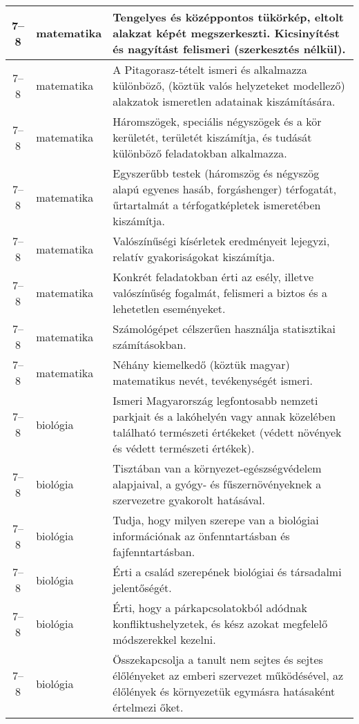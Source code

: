 \begin{small}
\begin{longtable}{c | p{2cm} |  p{11cm} }
              7--8 & matematika & Tengelyes és középpontos tükörkép, eltolt alakzat képét megszerkeszti. Kicsinyítést és nagyítást felismeri (szerkesztés nélkül). \\ \hline
              7--8 & matematika & A Pitagorasz-tételt ismeri és alkalmazza különböző, (köztük valós helyzeteket modellező) alakzatok ismeretlen adatainak kiszámítására. \\ \hline
              7--8 & matematika & Háromszögek, speciális négyszögek és a kör kerületét, területét kiszámítja, és tudását különböző feladatokban alkalmazza. \\ \hline
              7--8 & matematika & Egyszerűbb testek (háromszög és négyszög alapú egyenes hasáb, forgáshenger) térfogatát, űrtartalmát a térfogatképletek ismeretében kiszámítja. \\ \hline
              7--8 & matematika & Valószínűségi kísérletek eredményeit lejegyzi, relatív gyakoriságokat kiszámítja. \\ \hline
              7--8 & matematika & Konkrét feladatokban érti az esély, illetve valószínűség fogalmát, felismeri a biztos és a lehetetlen eseményeket. \\ \hline
              7--8 & matematika & Számológépet célszerűen használja statisztikai számításokban. \\ \hline
              7--8 & matematika & Néhány kiemelkedő (köztük magyar) matematikus nevét, tevékenységét ismeri. \\ \hline
              7--8 & biológia & Ismeri Magyarország legfontosabb nemzeti parkjait és a lakóhelyén vagy annak közelében található természeti értékeket (védett növények és védett természeti értékek). \\ \hline
              7--8 & biológia & Tisztában van a környezet-egészségvédelem alapjaival, a gyógy- és fűszernövényeknek a szervezetre gyakorolt hatásával. \\ \hline
              7--8 & biológia & Tudja, hogy milyen szerepe van a biológiai információnak az önfenntartásban és fajfenntartásban. \\ \hline
              7--8 & biológia & Érti a család szerepének biológiai és társadalmi jelentőségét. \\ \hline
              7--8 & biológia & Érti, hogy a párkapcsolatokból adódnak konfliktushelyzetek, és kész azokat megfelelő módszerekkel kezelni. \\ \hline
              7--8 & biológia & Összekapcsolja a tanult nem sejtes és sejtes élőlényeket az emberi szervezet működésével, az élőlények és környezetük egymásra hatásaként értelmezi őket. \\ \hline

\end{longtable}
\end{small}
